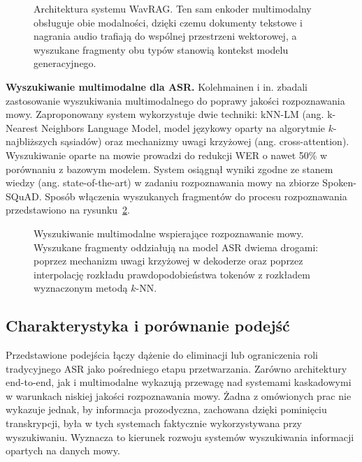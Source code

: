 \begin{figure}[htbp]
    \centering
    \caption{Architektura systemu WavRAG. Ten sam enkoder multimodalny obsługuje obie modalności, dzięki czemu dokumenty tekstowe i nagrania audio trafiają do wspólnej przestrzeni wektorowej, a wyszukane fragmenty obu typów stanowią kontekst modelu generacyjnego.}
    \label{fig:wavragArchitecture}
\end{figure}

\textbf{Wyszukiwanie multimodalne dla ASR.} Kolehmainen i in. \cite{kolehmainen2024multimodalretrievallargelanguage} zbadali zastosowanie wyszukiwania multimodalnego do poprawy jakości rozpoznawania mowy. Zaproponowany system wykorzystuje dwie techniki: kNN-LM (ang. k-Nearest Neighbors Language Model, model językowy oparty na algorytmie $k$-najbliższych sąsiadów) oraz mechanizmy uwagi krzyżowej (ang. cross-attention). Wyszukiwanie oparte na mowie prowadzi do redukcji WER o nawet 50\% w porównaniu z bazowym modelem. System osiągnął wyniki zgodne ze stanem wiedzy (ang. state-of-the-art) w zadaniu rozpoznawania mowy na zbiorze Spoken-SQuAD. Sposób włączenia wyszukanych fragmentów do procesu rozpoznawania przedstawiono na rysunku~\ref{fig:multimodalAsrArchitecture}.

\begin{figure}[htbp]
    \centering
    \caption{Wyszukiwanie multimodalne wspierające rozpoznawanie mowy. Wyszukane fragmenty oddziałują na model ASR dwiema drogami: poprzez mechanizm uwagi krzyżowej w dekoderze oraz poprzez interpolację rozkładu prawdopodobieństwa tokenów z rozkładem wyznaczonym metodą $k$-NN.}
    \label{fig:multimodalAsrArchitecture}
\end{figure}

\subsection{Charakterystyka i porównanie podejść}

Przedstawione podejścia łączy dążenie do eliminacji lub ograniczenia roli tradycyjnego ASR jako pośredniego etapu przetwarzania. Zarówno architektury end-to-end, jak i multimodalne wykazują przewagę nad systemami kaskadowymi w warunkach niskiej jakości rozpoznawania mowy. Żadna z omówionych prac nie wykazuje jednak, by informacja prozodyczna, zachowana dzięki pominięciu transkrypcji, była w tych systemach faktycznie wykorzystywana przy wyszukiwaniu. Wyznacza to kierunek rozwoju systemów wyszukiwania informacji opartych na danych mowy.
